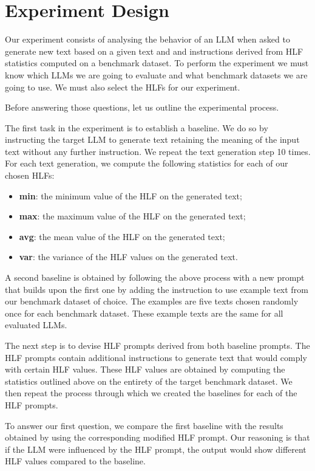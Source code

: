 \documentclass[runningheads,a4paper,11pt]{article}
\begin{document}
\section{Experiment Design}\label{method}

Our experiment consists of analysing the behavior of an LLM when asked to
generate new text based on a given text and and instructions derived from HLF
statistics computed on a benchmark dataset.
To perform the experiment we must know which LLMs we are going to evaluate and
what benchmark datasets we are going to use.
We must also select the HLFs for our experiment.

Before answering those questions, let us outline the experimental process.

The first task in the experiment is to establish a baseline.
We do so by instructing the target LLM to generate text retaining the meaning of
the input text without any further instruction.
We repeat the text generation step 10 times.
For each text generation, we compute the following statistics for each of our
chosen HLFs:

\begin{itemize}
    \item \textbf{min}: the minimum value of the HLF on the generated text;
    \item \textbf{max}: the maximum value of the HLF on the generated text;
    \item \textbf{avg}: the mean value of the HLF on the generated text;
    \item \textbf{var}: the variance of the HLF values on the generated text.
\end{itemize}

A second baseline is obtained by following the above process with a new prompt
that builds upon the first one by adding the instruction to use example
text from our benchmark dataset of choice.
The examples are five texts chosen randomly once for each benchmark dataset.
These example texts are the same for all evaluated LLMs.

The next step is to devise HLF prompts derived from both baseline prompts.
The HLF prompts contain additional instructions to generate text that would
comply with certain HLF values.
These HLF values are obtained by computing the statistics outlined above on
the entirety of the target benchmark dataset.
We then repeat the process through which we created the baselines for each of
the HLF prompts.

To answer our first question, we compare the first baseline with the results
obtained by using the corresponding modified HLF prompt.
Our reasoning is that if the LLM were influenced by the HLF prompt, the output
would show different HLF values compared to the baseline.
\end{document}
